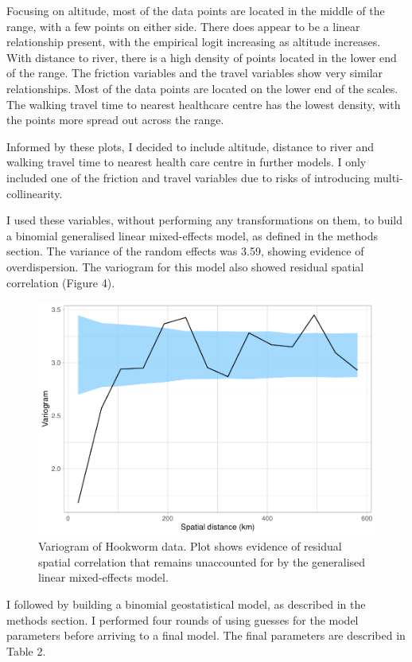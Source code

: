 \documentclass[
]{article}
\begin{document}
Focusing on altitude, most of the data points are located in the middle
of the range, with a few points on either side. There does appear to be
a linear relationship present, with the empirical logit increasing as
altitude increases. With distance to river, there is a high density of
points located in the lower end of the range. The friction variables and
the travel variables show very similar relationships. Most of the data
points are located on the lower end of the scales. The walking travel
time to nearest healthcare centre has the lowest density, with the
points more spread out across the range.

Informed by these plots, I decided to include altitude, distance to
river and walking travel time to nearest health care centre in further
models. I only included one of the friction and travel variables due to
risks of introducing multi-collinearity.

I used these variables, without performing any transformations on them,
to build a binomial generalised linear mixed-effects model, as defined
in the methods section. The variance of the random effects was 3.59,
showing evidence of overdispersion. The variogram for this model also
showed residual spatial correlation (Figure 4).

\begin{figure}
\centering
\includegraphics{write_up_files/figure-latex/HK.variogram_2-1.pdf}
\caption{Variogram of Hookworm data. Plot shows evidence of residual
spatial correlation that remains unaccounted for by the generalised
linear mixed-effects model.}
\end{figure}

I followed by building a binomial geostatistical model, as described in
the methods section. I performed four rounds of using guesses for the
model parameters before arriving to a final model. The final parameters
are described in Table 2.
\end{document}
